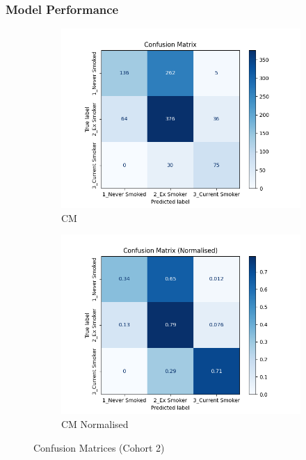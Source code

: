\documentclass{article}
\begin{document}
\subsubsection{Model Performance} \label{sec:cohort2-performance}
\begin{figure}
    \begin{subfigure}{0.49\textwidth}
        \centering
        \includegraphics[width=\linewidth]{cohort2_cm.png}
        \caption{CM}
    \end{subfigure}
    \hfill
    \begin{subfigure}{0.49\textwidth}
        \centering
        \includegraphics[width=\linewidth]{cohort2_cm_n.png}
        \caption{CM Normalised}
    \end{subfigure}
    \caption{Confusion Matrices (Cohort 2)}
\end{figure}
\end{document}
